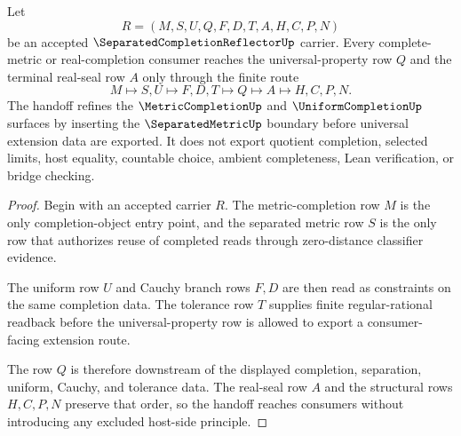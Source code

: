 \begin{theorem}
\label{thm:separated-completion-reflector-universal-handoff}
Let
$$
R=(M,S,U,Q,F,D,T,A,H,C,P,N)
$$
be an accepted $\SeparatedCompletionReflectorUp$ carrier. Every complete-metric or real-completion consumer reaches the universal-property row $Q$ and the terminal real-seal row $A$ only through the finite route
$$
M\longmapsto S,U\longmapsto F,D,T\longmapsto Q\longmapsto A\longmapsto H,C,P,N .
$$
The handoff refines the $\MetricCompletionUp$ and $\UniformCompletionUp$ surfaces by inserting the $\SeparatedMetricUp$ boundary before universal extension data are exported. It does not export quotient completion, selected limits, host equality, countable choice, ambient completeness, Lean verification, or bridge checking.
\end{theorem}
\begin{proof}
Begin with an accepted carrier $R$. The metric-completion row $M$ is the only completion-object entry point, and the separated metric row $S$ is the only row that authorizes reuse of completed reads through zero-distance classifier evidence.

The uniform row $U$ and Cauchy branch rows $F,D$ are then read as constraints on the same completion data. The tolerance row $T$ supplies finite regular-rational readback before the universal-property row is allowed to export a consumer-facing extension route.

The row $Q$ is therefore downstream of the displayed completion, separation, uniform, Cauchy, and tolerance data. The real-seal row $A$ and the structural rows $H,C,P,N$ preserve that order, so the handoff reaches consumers without introducing any excluded host-side principle.
\end{proof}

